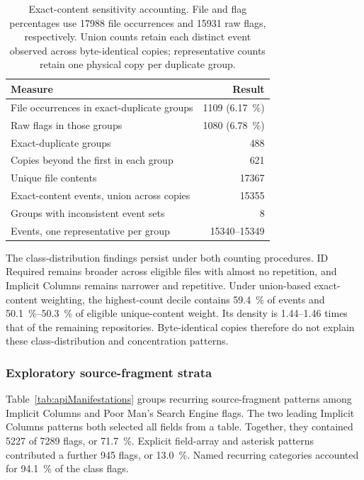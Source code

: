 \begin{table}[tbp]
    \centering
    \small
    \caption{Exact-content sensitivity accounting. File and flag percentages use \num{17988} file occurrences and \num{15931} raw flags, respectively. Union counts retain each distinct event observed across byte-identical copies; representative counts retain one physical copy per duplicate group.}
    \label{tab:exactContentSensitivity}
    \begin{tabular}{p{}r}
        \hline
        \textbf{Measure} & \textbf{Result} \\
        \hline
        File occurrences in exact-duplicate groups & \num{1109} (\qty{6.17}{\percent}) \\
        Raw flags in those groups & \num{1080} (\qty{6.78}{\percent}) \\
        Exact-duplicate groups & \num{488} \\
        Copies beyond the first in each group & \num{621} \\
        Unique file contents & \num{17367} \\
        Exact-content events, union across copies & \num{15355} \\
        Groups with inconsistent event sets & \num{8} \\
        Events, one representative per group & \numrange{15340}{15349} \\
        \hline
    \end{tabular}
\end{table}

The class-distribution findings persist under both counting procedures. ID Required remains broader across eligible files with almost no repetition, and Implicit Columns remains narrower and repetitive. Under union-based exact-content weighting, the highest-count decile contains \qty{59.4}{\percent} of events and \qtyrange{50.1}{50.3}{\percent} of eligible unique-content weight. Its density is \numrange{1.44}{1.46} times that of the remaining repositories. Byte-identical copies therefore do not explain these class-distribution and concentration patterns.

\subsubsection{Exploratory source-fragment strata}\label{sec:fragmentStrata}

Table~\ref{tab:apiManifestations} groups recurring source-fragment patterns among Implicit Columns and Poor Man's Search Engine flags. The two leading Implicit Columns patterns both selected all fields from a table. Together, they contained \num{5227} of \num{7289} flags, or \qty{71.7}{\percent}. Explicit field-array and asterisk patterns contributed a further \num{945} flags, or \qty{13.0}{\percent}. Named recurring categories accounted for \qty{94.1}{\percent} of the class flags.

